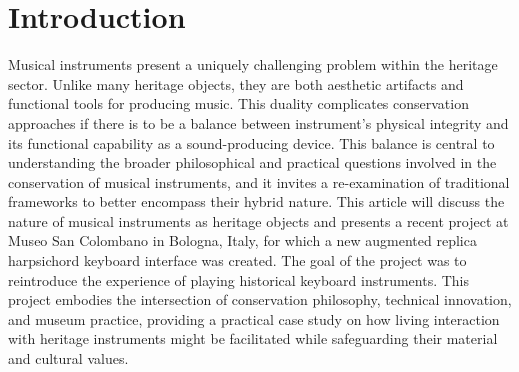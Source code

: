 






\section{Introduction}

Musical instruments present a uniquely challenging problem within the heritage sector. Unlike many heritage objects, they are both aesthetic artifacts and functional tools for producing music. This duality complicates conservation approaches if there is to be a balance between instrument's physical integrity and its functional capability as a sound-producing device. This balance is central to understanding the broader philosophical and practical questions involved in the conservation of musical instruments, and it invites a re-examination of traditional frameworks to better encompass their hybrid nature. This article will discuss the nature of musical instruments as heritage objects and presents a recent project at Museo San Colombano in Bologna, Italy, for which a new augmented replica harpsichord keyboard interface was created. The goal of the project was to reintroduce the experience of playing historical keyboard instruments. This project embodies the intersection of conservation philosophy, technical innovation, and museum practice, providing a practical case study on how living interaction with heritage instruments might be facilitated while safeguarding their material and cultural values.

